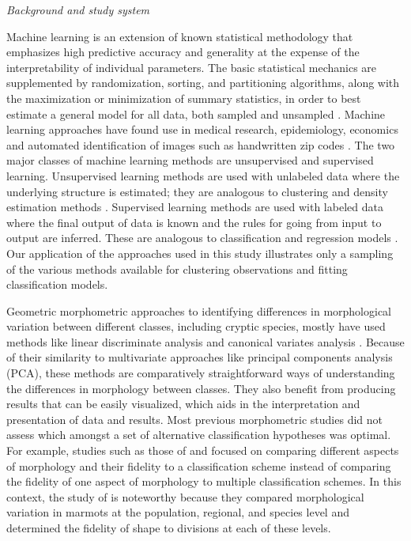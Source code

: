 \documentclass[12pt,letterpaper]{article}
\renewcommand{\subsection}[1]{%
\bigskip
\begin{center}
\begin{large}
\normalfont\itshape #1
\end{large}
\end{center}}
\begin{document}
\subsection{Background and study system}
Machine learning is an extension of known statistical methodology \citep{Hastie2009} that emphasizes high predictive accuracy and generality at the expense of the interpretability of individual parameters. The basic statistical mechanics are supplemented by randomization, sorting, and partitioning algorithms, along with the maximization or minimization of summary statistics, in order to best estimate a general model for all data, both sampled and unsampled \citep{Hastie2009}. Machine learning approaches have found use in medical research, epidemiology, economics and automated identification of images such as handwritten zip codes \citep{Hastie2009}. The two major classes of machine learning methods are unsupervised and supervised learning. Unsupervised learning methods are used with unlabeled data where the underlying structure is estimated; they are analogous to clustering and density estimation methods \citep{Kaufman1990}. Supervised learning methods are used with labeled data where the final output of data is known and the rules for going from input to output are inferred. These are analogous to classification and regression models \citep{Breiman1984}. Our application of the approaches used in this study illustrates only a sampling of the various methods available for clustering observations and fitting classification models. 

Geometric morphometric approaches to identifying differences in morphological variation between different classes, including cryptic species, mostly have used methods like linear discriminate analysis and canonical variates analysis \citep{Polly2003,Zelditch2004,Gaubert2005b,Gunduz2007,Polly2007a,Francoy2009,Sztencel-Jabonka2009,MitrovskiBogdanovic2013}. Because of their similarity to multivariate approaches like principal components analysis (PCA), these methods are comparatively straightforward ways of understanding the differences in morphology between classes. They also benefit from producing results that can be easily visualized, which aids in the interpretation and presentation of data and results. Most previous morphometric studies did not assess which amongst a set of alternative classification hypotheses was optimal. For example, studies such as those of \citet{Caumul2005a} and \citet{Polly2007a} focused on comparing different aspects of morphology and their fidelity to a classification scheme instead of comparing the fidelity of one aspect of morphology to multiple classification schemes. In this context, the study of \citet{Cardini2009a} is noteworthy because they compared morphological variation in marmots at the population, regional, and species level and determined the fidelity of shape to divisions at each of these levels.
\end{document}
